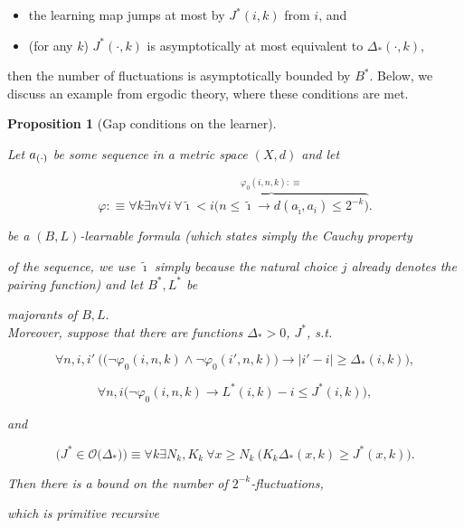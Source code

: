 \documentclass[1p]{elsarticle}
\newcommand{\be}[1][{e:\arabic{equation}}] { \begin{equation}\label{#1} }
\newcommand{\ee} { \end{equation} }
\theoremstyle{plain}
\newtheorem{prop}[thm]{Proposition}
\theoremstyle{definition}
\theoremstyle{remark}
\renewcommand{\phi}{\varphi}
\theoremstyle{definition}
\begin{document}
{\begin{itemize}
\item the learning map jumps at most by $J^*(i,k)$ from $i$, and

\item (for any $k$) $J^*(\cdot, k)$ is asymptotically at most equivalent to $\Delta_*(\cdot, k)$, 

\end{itemize}

then the number of fluctuations is asymptotically bounded by $B^*$. Below, we discuss an example from ergodic theory, where these conditions are met.



\begin{prop}[{Gap conditions on the learner}]\label{p:gap}

Let $a_{(\cdot)}$ be some sequence in a metric space $(X,d)$ and let 

\[

\phi:\equiv \forall k\exists n\forall i\ \overbrace{\forall \tilde{\imath}<i \big( n\leq \tilde{\imath}\rightarrow d(a_{\tilde{\imath}},a_{i})\leq 2^{-k}\big)}^{\phi_0(i,n,k):\equiv}.

\] 

be a $(B,L)$-learnable formula (which states simply the Cauchy property 

of the sequence, we use $\tilde{\imath}$ simply because the natural choice $j$ already denotes the pairing function) and let $B^*,L^*$ be

majorants of $B,L.$ \\

Moreover, suppose that there are functions $\Delta_*>0$, $J^*$, s.t.

\[\forall n,i,i'\ \Big( \big( \neg\phi_0(i,n,k)\wedge\neg\phi_0(i',n,k))\rightarrow

|i'-i|\geq\Delta_*(i,k)\Big),\]

\[\forall n,i \big( \neg\phi_0(i,n,k) \rightarrow L^*(i,k)-i\leq J^*(i,k)\big),\]

and

\be[e:O]

\big( J^*\in\mathcal{O}\big(\Delta_*\big)\big)\equiv \forall k\exists N_k,K_k\ 

\forall x\geq N_k\ \big( 

K_k\Delta_*(x,k)\geq J^*(x,k)\big).

\ee

Then there is a bound on the number of $2^{-k}$-fluctuations,

which is primitive recursive 


\end{prop}}
\end{document}
